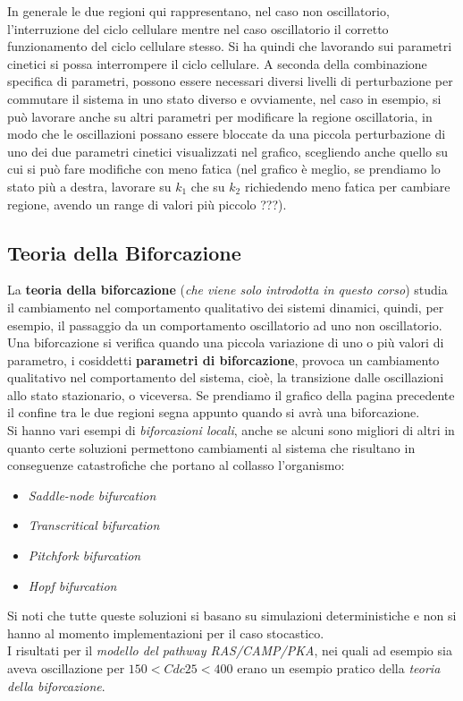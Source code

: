 \documentclass[a4paper,12pt, oneside]{book}
\begin{document}
In generale le due regioni qui rappresentano, nel caso non oscillatorio,
l'interruzione del ciclo cellulare mentre nel caso oscillatorio il corretto
funzionamento del ciclo cellulare stesso. Si ha quindi che lavorando sui
parametri cinetici si possa interrompere il ciclo cellulare. A seconda della
combinazione specifica di parametri, possono essere necessari diversi livelli di
perturbazione per commutare il sistema in uno stato diverso e ovviamente, nel
caso in esempio, si può lavorare anche su altri parametri per modificare la
regione oscillatoria, in modo che le oscillazioni possano essere bloccate da una
piccola perturbazione di uno dei due parametri cinetici visualizzati nel
grafico, scegliendo anche quello su cui si può fare modifiche con meno fatica
(nel grafico è meglio, se prendiamo lo stato più a destra, lavorare su $k_1$ che
su $k_2$ richiedendo meno fatica per cambiare regione, avendo un range di valori
più piccolo ???).
\subsection{Teoria della Biforcazione}
La \textbf{teoria della biforcazione} (\textit{che viene solo introdotta in
  questo corso}) studia il cambiamento nel comportamento qualitativo dei
sistemi dinamici, quindi, per esempio, il passaggio da un comportamento
oscillatorio ad uno non oscillatorio. \\
Una biforcazione si verifica quando una piccola variazione di uno o più valori
di parametro, i cosiddetti \textbf{parametri di biforcazione}, provoca un
cambiamento qualitativo nel comportamento del sistema, cioè, la transizione
dalle oscillazioni allo stato stazionario, o viceversa. Se prendiamo il grafico
della pagina precedente il confine tra le due regioni segna appunto quando si
avrà una biforcazione. \\
Si hanno vari esempi di \textit{biforcazioni locali}, anche se alcuni sono
migliori di 
altri in quanto certe soluzioni permettono cambiamenti al sistema che risultano
in conseguenze catastrofiche che portano al collasso l'organismo:
\begin{itemize}
  \item \textit{Saddle-node bifurcation}
  \item \textit{Transcritical bifurcation}
  \item \textit{Pitchfork bifurcation}
  \item \textit{Hopf bifurcation}
\end{itemize}
Si noti che tutte queste soluzioni si basano su simulazioni deterministiche e
non si hanno al momento implementazioni per il caso stocastico.\\
I risultati per il \textit{modello del pathway RAS/CAMP/PKA}, nei quali ad
esempio sia aveva oscillazione per $150<Cdc25<400$ erano un esempio pratico
della \textit{teoria della biforcazione}. 
\end{document}
